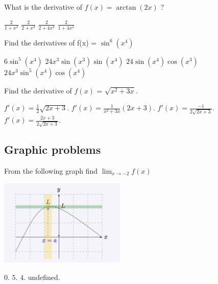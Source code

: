 \documentclass{exam}
\begin{document}
\begin{questions}
	\question What is the derivative of $f(x) = \arctan(2x)$ ?

	\begin{choices}
		\choice $\frac{2}{1 + x^{2}}$
		\choice $\frac{2}{2 + x^{2}}$
		\choice $\frac{2}{2 + 4x^{2}}$
		\CorrectChoice $\frac{2}{1 + 4x^{2}}$
	\end{choices}
	\question Find the derivatives of f(x) = $\sin^6(x^4)$

	\begin{choices}
		\choice $6\sin^{5}(x^4)$
		\choice $24 x^{3}\sin(x^3) \sin(x^4)$
		\choice $24\sin(x^4)  \cos(x^3)$
		\CorrectChoice $24 x^{3} \sin^{5}(x^4)  \cos(x^4) $
	\end{choices}
	\question Find the derivative of $f(x)$ = $\sqrt{x^2+3x}$.

	\begin{choices}
		\choice $f'(x) = \frac{1}{2}\sqrt{2x+3}$.
		\choice $f'(x) = \frac{1}{x^2+3x}(2x+3)$.
		\choice $f'(x) = \frac{-1}{2 \sqrt{2x + 3}}$.
		\CorrectChoice $f'(x) = \frac{2x + 3}{2 \sqrt{2x + 3}}$.
	\end{choices}


\end{questions}


\begin{questions}
\section{Graphic problems}
	\question
	From the following graph find $\lim_{x \to -2 } f(x)$
	\par\nopagebreak
	\includegraphics[width = 6cm]{limgraph.jpg}

	\begin{choices}
		\choice $0$.
		\choice $5$.
		\choice $4$.
		\CorrectChoice undefined.
	\end{choices}

\end{questions}
\end{document}
